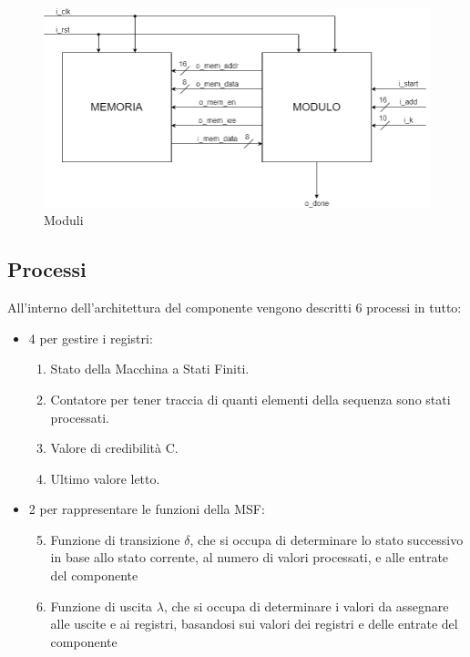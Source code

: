 \documentclass{article}
\begin{document}
\begin{figure}[H]
    \centering
    \includegraphics[width=\linewidth]{Component diagram.drawio.png}
    \caption{Moduli}
    \label{fig:components}
\end{figure}

\subsection{Processi}

All'interno dell'architettura del componente vengono descritti 6 processi in tutto:
\begin{itemize}
    \item 4 per gestire i registri:
    \begin{enumerate}
        \item Stato della Macchina a Stati Finiti.
        \item Contatore per tener traccia di quanti elementi della sequenza sono stati processati.
        \item Valore di credibilità C.
        \item Ultimo valore letto.
    \end{enumerate}

    \item 2 per rappresentare le funzioni della MSF:
    \begin{enumerate}
        \setcounter{enumi}{4}
        \item Funzione di transizione $\delta$, che si occupa di determinare lo stato successivo in base allo stato corrente, al numero di valori processati, e alle entrate del componente
        \item Funzione di uscita $\lambda$, che si occupa di determinare i valori da assegnare alle uscite e ai registri, basandosi sui valori dei registri e delle entrate del componente
    \end{enumerate}
\end{itemize}
\end{document}
